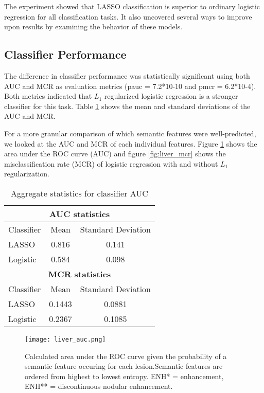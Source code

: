 The experiment showed that LASSO classification is superior to ordinary logistic regression for all classification tasks. It also uncovered several ways to improve upon results by examining the behavior of these models.

\subsection{Classifier Performance}
The difference in classifier performance was statistically significant using both AUC and MCR as evaluation metrics (pauc = 7.2*10-10 and pmcr = 6.2*10-4). Both metrics indicated that $L_1$ regularized logistic regression is a stronger classifier for this task. Table \ref{table:liver_auc_mcr} shows the mean and standard deviations of the AUC and MCR.

For a more granular comparison of which semantic features were well-predicted, we looked at the AUC and MCR of each individual features. Figure \ref{fig:liver_auc} shows the area under the ROC curve (AUC) and figure \ref{fig:liver_mcr} shows the misclassification rate (MCR) of logistic regression with and without $L_1$ regularization.

\begin{table}[h!]
	\centering
	\begin{tabular}{|l|c|c|}
		\hline
		\multicolumn{3}{|c|}{\textbf{AUC statistics}} \\ \hline
		Classifier & Mean & Standard Deviation\\ 
		\hline
		LASSO & 0.816 & 0.141 \\ 
		\hline 
		Logistic & 0.584 & 0.098 \\ 
		\hline \hline
		\multicolumn{3}{|c|}{\textbf{MCR statistics} }\\ 
		\hline
		Classifier & Mean & Standard Deviation\\ 
		\hline
		LASSO & 0.1443 & 0.0881 \\ 
		\hline 
		Logistic & 0.2367 & 0.1085 \\ 
		\hline 
	\end{tabular}
	\caption{Aggregate statistics for classifier AUC}
	\label{table:liver_auc_mcr}
\end{table}


\begin{figure}
	\centering
	\texttt{[image: liver\_auc.png]}
	\caption[AUC results for liver annotation]{Calculated area under the ROC curve given the probability of a semantic feature occuring for each lesion.Semantic features are ordered from highest to lowest entropy. ENH* = enhancement, ENH** = discontinuous nodular enhancement.}
	\label{fig:liver_auc}
\end{figure}


